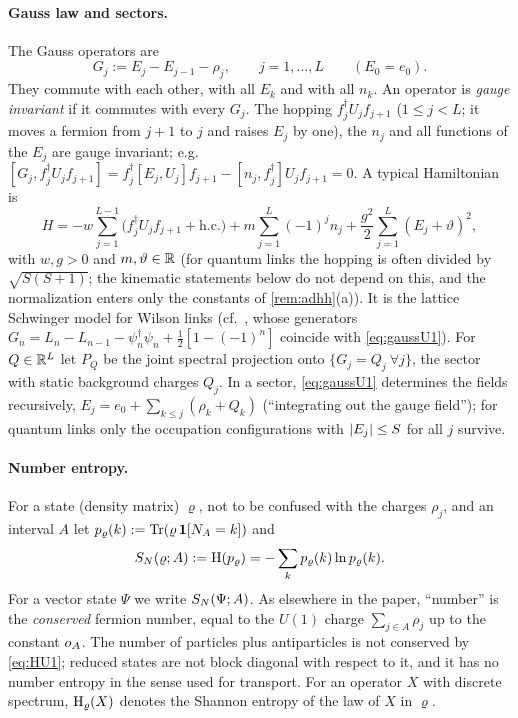 \paragraph{Gauss law and sectors.}
The Gauss operators are
\begin{equation}\label{eq:gaussU1}
  G_j:=E_j-E_{j-1}-\rho_j,\qquad j=1,\dots,L\qquad(E_0=e_0).
\end{equation}
They commute with each other, with all $E_k$ and with all $n_k$.  An operator is \emph{gauge invariant} if it
commutes with every $G_j$.  The hopping $f_j^\dagger U_jf_{j+1}$ ($1\le j<L$; it moves a fermion from $j+1$ to $j$
and raises $E_j$ by one), the $n_j$ and all functions of the $E_j$ are gauge invariant; e.g.\
$[G_j,f_j^\dagger U_jf_{j+1}]=f_j^\dagger[E_j,U_j]f_{j+1}-[n_j,f_j^\dagger]U_jf_{j+1}=0$.  A typical Hamiltonian is
\begin{equation}\label{eq:HU1}
  H=-w\sum_{j=1}^{L-1}\bigl(f_j^\dagger U_jf_{j+1}+\text{h.c.}\bigr)+m\sum_{j=1}^L(-1)^jn_j
  +\frac{g^2}2\sum_{j=1}^L(E_j+\vartheta)^2,
\end{equation}
with $w,g>0$ and $m,\vartheta\in\mathbb{R}$ (for quantum links the hopping is often divided by $\sqrt{S(S+1)}$; the kinematic
statements below do not depend on this, and the normalization enters only the constants of \cref{rem:adhh}(a)).  It is the lattice Schwinger model for Wilson links (cf.\ \cite[Eq.~(1)]{Brenes2018},
whose generators $G_n=L_n-L_{n-1}-\psi_n^\dagger\psi_n+\frac12[1-(-1)^n]$ coincide with \eqref{eq:gaussU1}).  For
$Q\in\mathbb{R}^L$ let $P_Q$ be the joint spectral projection onto $\{G_j=Q_j\ \forall j\}$, the sector with static
background charges $Q_j$.  In a sector, \eqref{eq:gaussU1} determines the fields recursively,
$E_j=e_0+\sum_{k\le j}(\rho_k+Q_k)$ (``integrating out the gauge field''); for quantum links only the occupation
configurations with $\left|E_j\right|\le S$ for all $j$ survive.

\paragraph{Number entropy.}
For a state (density matrix) $\varrho$, not to be confused with the charges $\rho_j$, and an interval $A$ let $p_\varrho(k):=\operatorname{Tr}(\varrho\,\mathbf{1}[N_A=k])$ and
\[
  S_{N}(\varrho;A):=\mathrm{H}(p_\varrho)=-\sum_kp_\varrho(k)\ln p_\varrho(k).
\]
For a vector state $\Psi$ we write $S_{N}(\Psi;A)$.  As elsewhere in the paper, ``number'' is the \emph{conserved}
fermion number, equal to the $U(1)$ charge $\sum_{j\in A}\rho_j$ up to the constant $o_A$.  The number of
particles plus antiparticles is not conserved by \eqref{eq:HU1}; reduced states are not block diagonal with
respect to it, and it has no number entropy in the sense used for transport.  For an operator $X$ with discrete
spectrum, $\mathrm{H}_\varrho(X)$ denotes the Shannon entropy of the law of $X$ in $\varrho$.

